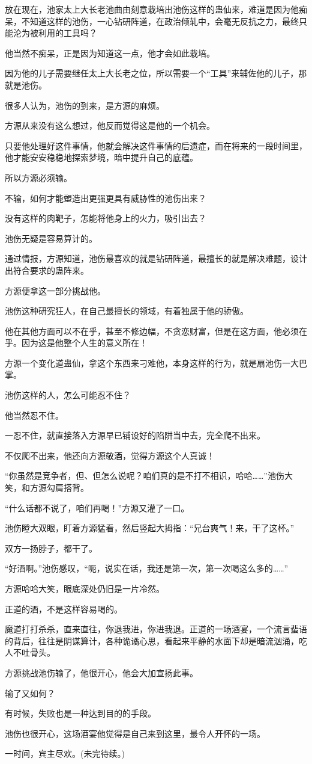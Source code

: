 \begin{this_body}
放在现在，池家太上大长老池曲由刻意栽培出池伤这样的蛊仙来，难道是因为他痴呆，不知道这样的池伤，一心钻研阵道，在政治倾轧中，会毫无反抗之力，最终只能沦为被利用的工具吗？

他当然不痴呆，正是因为知道这一点，他才会如此栽培。

因为他的儿子需要继任太上大长老之位，所以需要一个“工具”来辅佐他的儿子，那就是池伤。

很多人认为，池伤的到来，是方源的麻烦。

方源从来没有这么想过，他反而觉得这是他的一个机会。

只要他处理好这件事情，他就会解决这件事情的后遗症，而在将来的一段时间里，他才能安安稳稳地探索梦境，暗中提升自己的底蕴。

所以方源必须输。

不输，如何才能塑造出更强更具有威胁性的池伤出来？

没有这样的肉靶子，怎能将他身上的火力，吸引出去？

池伤无疑是容易算计的。

通过情报，方源知道，池伤最喜欢的就是钻研阵道，最擅长的就是解决难题，设计出符合要求的蛊阵来。

方源便拿这一部分挑战他。

池伤这种研究狂人，在自己最擅长的领域，有着独属于他的骄傲。

他在其他方面可以不在乎，甚至不修边幅，不贪恋财富，但是在这方面，他必须在乎。因为这是他整个人生的意义所在！

方源一个变化道蛊仙，拿这个东西来刁难他，本身这样的行为，就是扇池伤一大巴掌。

池伤这样的人，怎么可能忍不住？

他当然忍不住。

一忍不住，就直接落入方源早已铺设好的陷阱当中去，完全爬不出来。

不仅爬不出来，他还向方源敬酒，觉得方源这个人真诚！

“你虽然是竞争者，但、但怎么说呢？咱们真的是不打不相识，哈哈……”池伤大笑，和方源勾肩搭背。

“什么话都不说了，咱们再喝！”方源又灌了一口。

池伤瞪大双眼，盯着方源猛看，然后竖起大拇指：“兄台爽气！来，干了这杯。”

双方一扬脖子，都干了。

“好酒啊。”池伤感叹，“呃，说实在话，我还是第一次，第一次喝这么多的……”

方源哈哈大笑，眼底深处仍旧是一片冷然。

正道的酒，不是这样容易喝的。

魔道打打杀杀，直来直往，你退我进，你进我退。正道的一场酒宴，一个流言蜚语的背后，往往是阴谋算计，各种诡谲心思，看起来平静的水面下却是暗流汹涌，吃人不吐骨头。

方源挑战池伤输了，他很开心，他会大加宣扬此事。

输了又如何？

有时候，失败也是一种达到目的的手段。

池伤也很开心，这场酒宴他觉得是自己来到这里，最令人开怀的一场。

一时间，宾主尽欢。(未完待续。)

\end{this_body}

